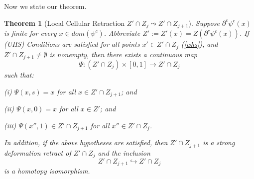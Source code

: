 \documentclass[12pt]{amsart}
\newtheorem{thm}{Theorem}
\theoremstyle{definition}
\theoremstyle{remark}
\newcommand{\bR}{\mathbb{R}}
\newcommand{\del}{\partial}
\newcommand{\sub}{\del^c \psi^c(x')}
\newcommand{\cd}{c_\Delta}
\begin{document}












Now we state our theorem.
\begin{thm}[Local Cellular Retraction 
$Z'\cap Z_j \leadsto Z' \cap Z_{j+1}$]


Suppose $\del^c \psi^c(x)$ is finite for every $x\in dom(\psi^c)$. Abbreviate $Z':=Z'(x)=Z(\del^c \psi^c(x))$. If (UHS) Conditions are satisfied for all points $x' \in Z' \cap Z_j$ (\ref{whs}), and $Z' \cap Z_{j+1} \neq \emptyset$ is nonempty, then there exists a continuous map $$\Psi: (Z' \cap Z_j) \times [0,1] \to Z' \cap Z_j $$ 
such that:

(i) $\Psi(x,s)=x$ for all $x \in Z' \cap Z_{j+1}$; and

(ii) $\Psi(x,0)=x$ for all $x\in Z'$; and 

(iii) $\Psi(x'',1) \in Z' \cap Z_{j+1}$ for all $x'' \in Z' \cap Z_j$.

In addition, if the above hypotheses are satisfied, then $Z'\cap Z_{j+1}$ is a strong deformation retract of $Z' \cap Z_j$ and the inclusion $$Z'\cap Z_{j+1} \hookrightarrow Z'\cap Z_j$$ is a homotopy isomorphism.
\label{retract1} 
\end{thm}
\end{document}
